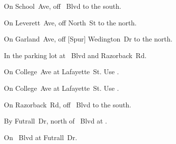 
\begin{LocationList}

On School~Ave, off  \MLKing~Blvd to the south.

\Location{\GarageHQ \Garage}
On Leverett~Ave, off North~St to the north.

On  Garland~Ave, off [Spur] Wedington~Dr to the north.

In the parking lot at  \MLKing~Blvd and Razorback~Rd.

On College~Ave at  Lafayette~St.
Use  .

On College~Ave at  Lafayette~St.
Use  .

On Razorback~Rd, off  \MLKing~Blvd to the south.

\Location{\TruckService \Service}
By Futrall~Dr, north of  \MLKing~Blvd at .

On  \MLKing~Blvd at Futrall~Dr.

\end{LocationList}

